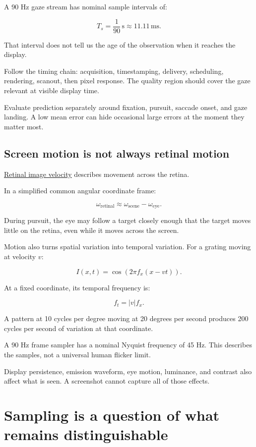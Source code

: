 A 90 Hz gaze stream has nominal sample intervals of:

\[
T_s=\frac1{90}\,\mathrm{s}\approx11.11\,\mathrm{ms}.
\]

That interval does not tell us the age of the observation when it reaches the display.

Follow the timing chain: acquisition, timestamping, delivery, scheduling, rendering, scanout, then pixel response. The quality region should cover the gaze relevant at visible display time.

Evaluate prediction separately around fixation, pursuit, saccade onset, and gaze landing. A low mean error can hide occasional large errors at the moment they matter most.

\subsection{Screen motion is not always retinal motion}\label{04-visual-computing-ii-ch043-screen-motion-is-not-always-retinal-motion}

\hyperref[appendix-70895739febb]{Retinal image velocity} describes movement across the retina.

In a simplified common angular coordinate frame:

\[
\omega_{\mathrm{retinal}}
\approx\omega_{\mathrm{scene}}-\omega_{\mathrm{eye}}.
\]

During pursuit, the eye may follow a target closely enough that the target moves little on the retina, even while it moves across the screen.

Motion also turns spatial variation into temporal variation. For a grating moving at velocity \(v\):

\[
I(x,t)=\cos\!\left(2\pi f_x(x-vt)\right).
\]

At a fixed coordinate, its temporal frequency is:

\[
f_t=|v|f_x.
\]

A pattern at 10 cycles per degree moving at 20 degrees per second produces 200 cycles per second of variation at that coordinate.

A 90 Hz frame sampler has a nominal Nyquist frequency of 45 Hz. This describes the samples, not a universal human flicker limit.

Display persistence, emission waveform, eye motion, luminance, and contrast also affect what is seen. A screenshot cannot capture all of those effects.

\section{Sampling is a question of what remains distinguishable}\label{04-visual-computing-ii-ch043-sampling-is-a-question-of-what-remains-distinguishable}

